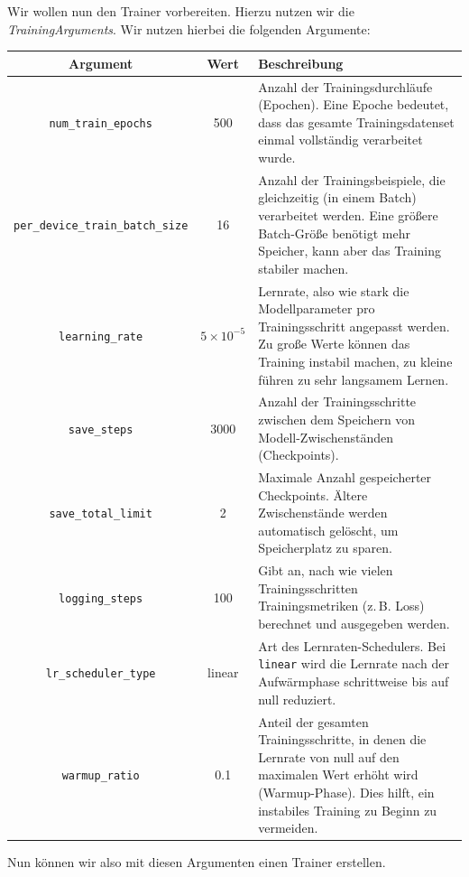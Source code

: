 \documentclass[a4paper, 11pt]{article}          %
\begin{document}
Wir wollen nun den Trainer vorbereiten. Hierzu nutzen wir die \emph{TrainingArguments}. Wir nutzen hierbei die folgenden Argumente: 
\begin{center}
    \begin{tabularx}{\textwidth}{|c|c|X|}
        \hline
        \textbf{Argument} & \textbf{Wert} & \textbf{Beschreibung} \\
        \hline
        \verb|num_train_epochs| & 500 & 
        Anzahl der Trainingsdurchläufe (Epochen). Eine Epoche bedeutet, dass das gesamte Trainingsdatenset einmal vollständig verarbeitet wurde. \\
        \hline
        \verb|per_device_train_batch_size| & 16 & 
        Anzahl der Trainingsbeispiele, die gleichzeitig (in einem Batch) verarbeitet werden. Eine größere Batch-Größe benötigt mehr Speicher, kann aber das Training stabiler machen. \\
        \hline
        \verb|learning_rate| & $5 \times 10^{-5}$ & 
        Lernrate, also wie stark die Modellparameter pro Trainingsschritt angepasst werden. Zu große Werte können das Training instabil machen, zu kleine führen zu sehr langsamem Lernen. \\
        \hline
        \verb|save_steps| & 3000 & 
        Anzahl der Trainingsschritte zwischen dem Speichern von Modell-Zwischenständen (Checkpoints). \\
        \hline
        \verb|save_total_limit| & 2 & 
        Maximale Anzahl gespeicherter Checkpoints. Ältere Zwischenstände werden automatisch gelöscht, um Speicherplatz zu sparen. \\
        \hline
        \verb|logging_steps| & 100 & 
        Gibt an, nach wie vielen Trainingsschritten Trainingsmetriken (z.\,B. Loss) berechnet und ausgegeben werden. \\
        \hline
        \verb|lr_scheduler_type| & linear & 
        Art des Lernraten-Schedulers. Bei \texttt{linear} wird die Lernrate nach der Aufwärmphase schrittweise bis auf null reduziert. \\
        \hline
        \verb|warmup_ratio| & 0.1 & 
        Anteil der gesamten Trainingsschritte, in denen die Lernrate von null auf den maximalen Wert erhöht wird (Warmup-Phase). Dies hilft, ein instabiles Training zu Beginn zu vermeiden. \\
        \hline
    \end{tabularx}
\end{center}
\cite{transformersDocs}
Nun können wir also mit diesen Argumenten einen Trainer erstellen.
\end{document}
